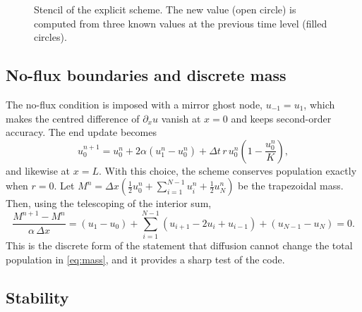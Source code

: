 \documentclass[11pt,a4paper]{article}
\begin{document}
\begin{figure}[H]
\centering
{}
\caption{Stencil of the explicit scheme. The new value (open circle) is computed from three known
values at the previous time level (filled circles).}
\label{fig:stencil}
\end{figure}

\subsection{No-flux boundaries and discrete mass}
The no-flux condition is imposed with a mirror ghost node, $u_{-1}=u_1$, which makes the centred
difference of $\partial_x u$ vanish at $x=0$ and keeps second-order accuracy. The end update becomes
\begin{equation}
  u_0^{n+1}=u_0^n+2\alpha\left(u_1^n-u_0^n\right)+\Delta t\,r\,u_0^n\left(1-\frac{u_0^n}{K}\right),
\end{equation}
and likewise at $x=L$. With this choice, the scheme conserves population exactly when $r=0$. Let
$M^n=\Delta x\left(\tfrac12u_0^n+\sum_{i=1}^{N-1}u_i^n+\tfrac12u_N^n\right)$ be the trapezoidal mass.
Then, using the telescoping of the interior sum,
\begin{equation}
  \frac{M^{n+1}-M^n}{\alpha\,\Delta x}
  =(u_1-u_0)+\sum_{i=1}^{N-1}(u_{i+1}-2u_i+u_{i-1})+(u_{N-1}-u_N)=0 .
\end{equation}
This is the discrete form of the statement that diffusion cannot change the total population in
\eqref{eq:mass}, and it provides a sharp test of the code.

\subsection{Stability}\label{sec:stability}
\end{document}
